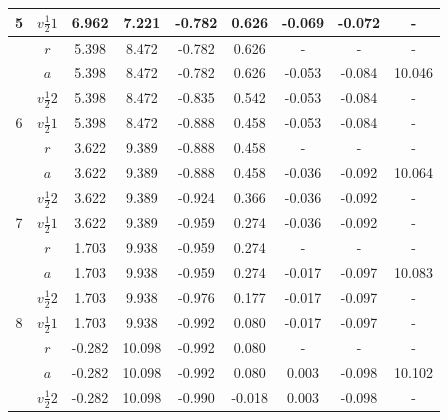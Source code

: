 \begin{table}[h]
\begin{tabular}{|c|c|c|c|c|c|c|c|c|}
5 & $v\frac{1}{2}1$  &	 6.962 &	7.221 &	-0.782 &	0.626 &	-0.069 & -0.072	& -      \\ \hline
  & $r$	             &   5.398 &	8.472	& -0.782 &	0.626	&	-	     & -      & -      \\ \hline
  & $a$	             &   5.398 &	8.472	& -0.782 & 	0.626	& -0.053 & -0.084 &	10.046 \\ \hline
  & $v\frac{1}{2}2$  &	 5.398 &	8.472	& -0.835 &	0.542	& -0.053 & -0.084	& -      \\ \hline
6 & $v\frac{1}{2}1$	 &   5.398 &	8.472	& -0.888 &	0.458	& -0.053 & -0.084	& -      \\ \hline
  & $r$	             &   3.622 &	9.389	& -0.888 &	0.458	&	-	     & -      & -      \\ \hline
  & $a$	             &   3.622 &	9.389	& -0.888 &	0.458	& -0.036 & -0.092	& 10.064 \\ \hline
  & $v\frac{1}{2}2$  &	 3.622 & 	9.389	& -0.924 &	0.366	& -0.036 & -0.092	& -      \\ \hline
7 & $v\frac{1}{2}1$  &	 3.622 &	9.389	& -0.959 &	0.274	& -0.036 & -0.092	& -      \\ \hline
  & $r$	             &   1.703 &	9.938	& -0.959 &	0.274	& -		   & -      & -      \\ \hline
  & $a$	             &   1.703 &	9.938	& -0.959 &	0.274	& -0.017 & -0.097 &	10.083 \\ \hline
  & $v\frac{1}{2}2$  &	 1.703 &	9.938	& -0.976 &	0.177	& -0.017 & -0.097	& -      \\ \hline
8 & $v\frac{1}{2}1$  &	 1.703 &	9.938	& -0.992 &	0.080	& -0.017 & -0.097	& -      \\ \hline
  & $r$	             &  -0.282 & 10.098	& -0.992 &	0.080	&	-	     & -      & -      \\ \hline
  &	$a$              &  -0.282 & 10.098	& -0.992 &	0.080	&  0.003 & -0.098 &	10.102 \\ \hline
  & $v\frac{1}{2}2$  &	-0.282 & 10.098	& -0.990 & -0.018	&  0.003 & -0.098	& -      \\ \hline
\end{tabular}
\vspace{-40pt}
\end{table}